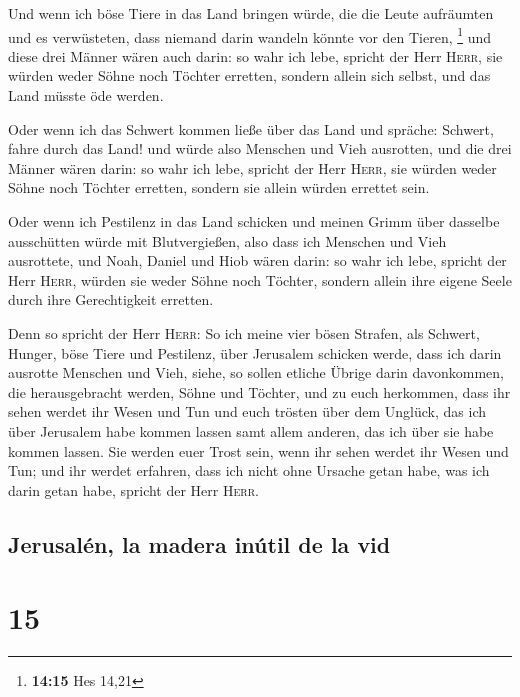  Und wenn ich böse Tiere in das Land bringen würde, die
die Leute aufräumten und es verwüsteten, dass niemand darin wandeln
könnte vor den Tieren, \footnote{\textbf{14:15} Hes 14,21}
 und diese drei Männer wären auch darin: so wahr ich
lebe, spricht der Herr \textsc{Herr}, sie würden weder Söhne noch
Töchter erretten, sondern allein sich selbst, und das Land müsste öde
werden.

 Oder wenn ich das Schwert kommen ließe über das Land und
spräche: Schwert, fahre durch das Land! und würde also Menschen und Vieh
ausrotten,  und die drei Männer wären darin: so wahr ich
lebe, spricht der Herr \textsc{Herr}, sie würden weder Söhne noch
Töchter erretten, sondern sie allein würden errettet sein.

 Oder wenn ich Pestilenz in das Land schicken und meinen
Grimm über dasselbe ausschütten würde mit Blutvergießen, also dass ich
Menschen und Vieh ausrottete,  und Noah, Daniel und Hiob
wären darin: so wahr ich lebe, spricht der Herr \textsc{Herr}, würden
sie weder Söhne noch Töchter, sondern allein ihre eigene Seele durch
ihre Gerechtigkeit erretten.

 Denn so spricht der Herr \textsc{Herr}: So ich meine
vier bösen Strafen, als Schwert, Hunger, böse Tiere und Pestilenz, über
Jerusalem schicken werde, dass ich darin ausrotte Menschen und Vieh,
 siehe, so sollen etliche Übrige darin davonkommen, die
herausgebracht werden, Söhne und Töchter, und zu euch herkommen, dass
ihr sehen werdet ihr Wesen und Tun und euch trösten über dem Unglück,
das ich über Jerusalem habe kommen lassen samt allem anderen, das ich
über sie habe kommen lassen.  Sie werden euer Trost sein,
wenn ihr sehen werdet ihr Wesen und Tun; und ihr werdet erfahren, dass
ich nicht ohne Ursache getan habe, was ich darin getan habe, spricht der
Herr \textsc{Herr}.

\hypertarget{jerusaluxe9n-la-madera-inuxfatil-de-la-vid}{%
\subsection{Jerusalén, la madera inútil de la
vid}\label{jerusaluxe9n-la-madera-inuxfatil-de-la-vid}}

\hypertarget{section-14}{%
\section{15}\label{section-14}}

